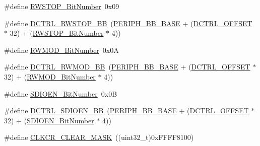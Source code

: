 \begin{DoxyCompactItemize}
\item 
\#define \mbox{\hyperlink{group___s_d_i_o___private___types_definitions_gae8c0654ad5cba23281bcfa77ef19b9cf}{R\+W\+S\+T\+O\+P\+\_\+\+Bit\+Number}}~0x09
\item 
\#define \mbox{\hyperlink{group___s_d_i_o___private___types_definitions_ga678da1db835676b0fb1976cf3408e2d1}{D\+C\+T\+R\+L\+\_\+\+R\+W\+S\+T\+O\+P\+\_\+\+BB}}~(\mbox{\hyperlink{group___peripheral__memory__map_gaed7efc100877000845c236ccdc9e144a}{P\+E\+R\+I\+P\+H\+\_\+\+B\+B\+\_\+\+B\+A\+SE}} + (\mbox{\hyperlink{group___s_d_i_o___private___types_definitions_ga948c1382c4cfd3af3e406c4d0cdd4240}{D\+C\+T\+R\+L\+\_\+\+O\+F\+F\+S\+ET}} $\ast$ 32) + (\mbox{\hyperlink{group___s_d_i_o___private___types_definitions_gae8c0654ad5cba23281bcfa77ef19b9cf}{R\+W\+S\+T\+O\+P\+\_\+\+Bit\+Number}} $\ast$ 4))
\item 
\#define \mbox{\hyperlink{group___s_d_i_o___private___types_definitions_gad7b722671f65e79d1be2899b643278ad}{R\+W\+M\+O\+D\+\_\+\+Bit\+Number}}~0x0A
\item 
\#define \mbox{\hyperlink{group___s_d_i_o___private___types_definitions_gad34bfe8650534ce24320ae83886c91e3}{D\+C\+T\+R\+L\+\_\+\+R\+W\+M\+O\+D\+\_\+\+BB}}~(\mbox{\hyperlink{group___peripheral__memory__map_gaed7efc100877000845c236ccdc9e144a}{P\+E\+R\+I\+P\+H\+\_\+\+B\+B\+\_\+\+B\+A\+SE}} + (\mbox{\hyperlink{group___s_d_i_o___private___types_definitions_ga948c1382c4cfd3af3e406c4d0cdd4240}{D\+C\+T\+R\+L\+\_\+\+O\+F\+F\+S\+ET}} $\ast$ 32) + (\mbox{\hyperlink{group___s_d_i_o___private___types_definitions_gad7b722671f65e79d1be2899b643278ad}{R\+W\+M\+O\+D\+\_\+\+Bit\+Number}} $\ast$ 4))
\item 
\#define \mbox{\hyperlink{group___s_d_i_o___private___types_definitions_ga37f3e1612e0dae8160be978ebfa54301}{S\+D\+I\+O\+E\+N\+\_\+\+Bit\+Number}}~0x0B
\item 
\#define \mbox{\hyperlink{group___s_d_i_o___private___types_definitions_ga894f7da62b89ddd9f4b79d066056a3c7}{D\+C\+T\+R\+L\+\_\+\+S\+D\+I\+O\+E\+N\+\_\+\+BB}}~(\mbox{\hyperlink{group___peripheral__memory__map_gaed7efc100877000845c236ccdc9e144a}{P\+E\+R\+I\+P\+H\+\_\+\+B\+B\+\_\+\+B\+A\+SE}} + (\mbox{\hyperlink{group___s_d_i_o___private___types_definitions_ga948c1382c4cfd3af3e406c4d0cdd4240}{D\+C\+T\+R\+L\+\_\+\+O\+F\+F\+S\+ET}} $\ast$ 32) + (\mbox{\hyperlink{group___s_d_i_o___private___types_definitions_ga37f3e1612e0dae8160be978ebfa54301}{S\+D\+I\+O\+E\+N\+\_\+\+Bit\+Number}} $\ast$ 4))
\item 
\#define \mbox{\hyperlink{group___s_d_i_o___private___types_definitions_gac8d10dd1e49ca9e8a6954146654e9a01}{C\+L\+K\+C\+R\+\_\+\+C\+L\+E\+A\+R\+\_\+\+M\+A\+SK}}~((uint32\+\_\+t)0x\+F\+F\+F\+F8100)

\end{DoxyCompactItemize}
